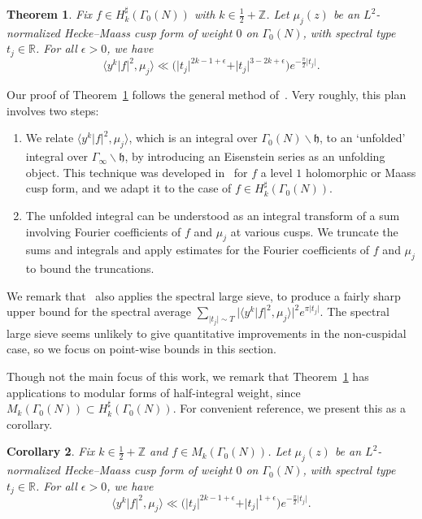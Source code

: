\documentclass[11pt,reqno]{amsart}
\theoremstyle{plain}
\newtheorem{theorem}{Theorem}[section]
\newtheorem{corollary}[theorem]{Corollary}
\theoremstyle{definition}
\numberwithin{equation}{section}
\begin{document}
\begin{theorem} \label{thm:triple-inner-product-bound}
Fix $f \in H_k^\sharp(\Gamma_0(N))$ with $k \in \frac{1}{2} + \mathbb{Z}$. Let $\mu_j(z)$ be an $L^2$-normalized Hecke--Maass cusp form of weight $0$ on $\Gamma_0(N)$, with spectral type $t_j \in \mathbb{R}$. For all $\epsilon > 0$, we have
\[
	\langle y^k \vert f \vert^2, \mu_j \rangle 
		\ll 
		\big( \vert t_j \vert^{2k-1 + \epsilon} + \vert t_j \vert^{3-2k + \epsilon} \big)
		e^{-\frac{\pi}{2} \vert t_j \vert}.
\]
\end{theorem}

Our proof of Theorem~\ref{thm:triple-inner-product-bound} follows the general method of~\cite{Jutila96,Jutila97}. Very roughly, this plan involves two steps:
\begin{enumerate}
	\item[a.] We relate $\langle y^k \vert f \vert^2, \mu_j \rangle$, which is an integral over $\Gamma_0(N) \backslash \mathfrak{h}$, to an `unfolded' integral over $\Gamma_\infty \backslash \mathfrak{h}$, by introducing an Eisenstein series as an unfolding object. This technique was developed in~\cite[\S{2}]{Jutila96} for $f$ a level $1$ holomorphic or Maass cusp form, and we adapt it to the case of $f \in H_k^\sharp(\Gamma_0(N))$.
	\item[b.] The unfolded integral can be understood as an integral transform of a sum involving Fourier coefficients of $f$ and $\mu_j$ at various cusps. We truncate the sums and integrals and apply estimates for the Fourier coefficients of $f$ and $\mu_j$ to bound the truncations.
\end{enumerate}
We remark that~\cite{Jutila97} also applies the spectral large sieve, to produce a fairly sharp upper bound for the spectral average $\sum_{\vert t_j \vert \sim T} \vert \langle y^k \vert f \vert^2, \mu_j \rangle \vert^2 e^{\pi \vert t_j \vert}$. The spectral large sieve seems unlikely to give quantitative improvements in the non-cuspidal case, so we focus on point-wise bounds in this section.

Though not the main focus of this work, we remark that Theorem~\ref{thm:triple-inner-product-bound} has applications to modular forms of half-integral weight, since $M_k(\Gamma_0(N)) \subset H_k^\sharp(\Gamma_0(N))$. For convenient reference, we present this as a corollary.

\begin{corollary} \label{cor:modular-form-specialization}
Fix $k \in \frac{1}{2} + \mathbb{Z}$ and $f \in M_k(\Gamma_0(N))$. Let $\mu_j(z)$ be an $L^2$-normalized Hecke--Maass cusp form of weight $0$ on $\Gamma_0(N)$, with spectral type $t_j \in \mathbb{R}$. For all $\epsilon > 0$, we have
\[
	\langle y^k \vert f \vert^2, \mu_j \rangle 
		\ll \big(\vert t_j \vert^{2k-1 + \epsilon} + \vert t_j \vert^{1+\epsilon}\big)
		e^{-\frac{\pi}{2} \vert t_j \vert}.
\]
\end{corollary}
\end{document}
